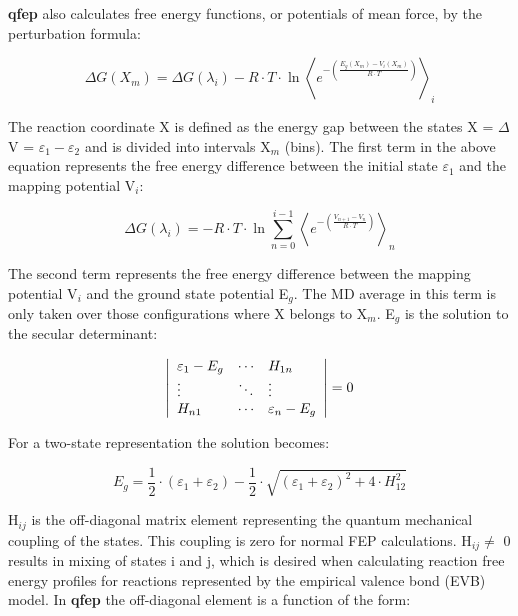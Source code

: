 \documentclass[a4paper,10pt]{article}
\begin{document}
\textbf{qfep} also calculates free energy functions, or potentials of mean
force, by the perturbation formula:

\begin {equation}
\Delta G(X_m) = \Delta G(\lambda_i) - R\cdot T\cdot \ln
\left\langle {e^{- \left( \frac{E_g (X_m)- V_i (X_m)}{R\cdot
T}\right)}} \right\rangle_i
\end{equation}

The reaction coordinate X is defined as the energy gap between the
states X = $\Delta$V = $\varepsilon_1 - \varepsilon_2$ and is
divided into intervals X$_{m}$ (bins). The first term in the above
equation represents the free energy difference between the initial
state $\varepsilon_{1}$ and the mapping potential V$_{i}$:

\begin {equation}
\Delta G\left( \lambda_i \right) = - R\cdot T\cdot \ln \sum
\limits_{n=0}^{i-1} {\left\langle e^{- \left( \frac{V_{n+1} -V_n
}{R\cdot T}\right)} \right\rangle _n }
\end{equation}

The second term represents the free energy difference between the
mapping potential V$_{i}$ and the ground state potential E$_{g}$.
The MD average in this term is only taken over those
configurations where X belongs to X$_{m}$. E$_{g}$ is the solution
to the secular determinant:

\begin {equation}
\label{secular_determinant} \left| {{\begin{array}{*{20}c}
 {\varepsilon _1 - E_g } \hfill & \cdots \hfill & H_{1n} \hfill \\
 \vdots \hfill & \ddots \hfill & \vdots \hfill \\
 H_{n1} \hfill & \cdots \hfill & {\varepsilon _n - E_g } \hfill \\
\end{array} }} \right|=0
\end{equation}


For a two-state representation the solution becomes:

\begin {equation}
\label{two_state} E_g =\textstyle{\frac{1}{2}}\cdot \left(
{\varepsilon_1 + \varepsilon_2 } \right) -
\textstyle{\frac{1}{2}}\cdot \sqrt {\left( \varepsilon_1 +
\varepsilon_2 \right)^2 + 4\cdot H^2_{12}}
\end{equation}

H$_{ij}$ is the off-diagonal matrix element representing the
quantum mechanical coupling of the states. This coupling is zero
for normal FEP calculations. H$_{ij} \ne $ 0 results in mixing of
states i and j, which is desired when calculating reaction free
energy profiles for reactions represented by the empirical valence
bond (EVB) model. In \textbf{qfep} the off-diagonal element is a function
of the form:
\end{document}
